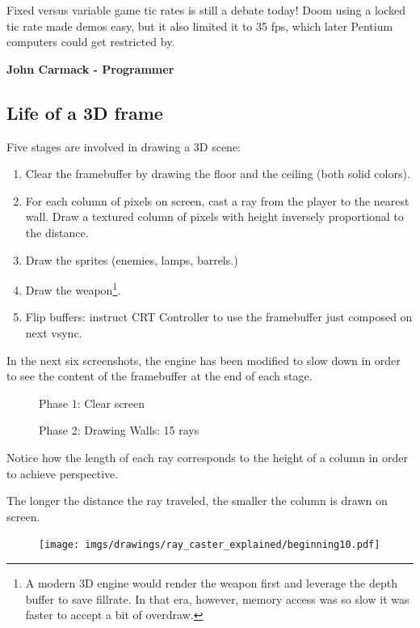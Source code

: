 \begin{fancyquotes}
 Fixed versus variable game tic rates is still a debate today!  Doom using a locked tic rate made demos easy, but it also limited it to 35 fps, which later Pentium computers could get restricted by.\\
\par
\textbf{John Carmack - Programmer}
 \end{fancyquotes}

\subsection{Life of a 3D frame}
Five stages are involved in drawing a 3D scene:\\
\begin{enumerate}
 \item Clear the framebuffer by drawing the floor and the ceiling (both solid colors).
 \item For each column of pixels on screen, cast a ray from the player to the nearest wall. Draw a textured column of pixels with height inversely proportional to the distance.
 \item Draw the sprites (enemies, lamps, barrels.)
 \item Draw the weapon\footnote{A modern 3D engine would render the weapon first and leverage the depth buffer to save fillrate. In that era, however, memory access was so slow it was faster to accept a bit of overdraw.}.	
 \item Flip buffers: instruct CRT Controller to use the framebuffer just composed on next vsync.
\end{enumerate}
In the next six screenshots, the engine has been modified to slow down in order to see the content of the framebuffer at the end of each stage.\\
\begin{figure}[H]
\centering
 \caption{Phase 1: Clear screen}
 \end{figure}




\begin{figure}[H]
 \centering
  \caption{Phase 2: Drawing Walls: 15 rays} 
\end{figure}
\begin{minipage}{.4\textwidth}
Notice how the length of each ray corresponds to the height of a column in order to achieve perspective.\\
\par
The longer the distance the ray traveled, the smaller the column is drawn on screen.
 \end{minipage}
\begin{minipage}{.6\textwidth}
\begin{figure}[H]
  \centering
 \texttt{[image: imgs/drawings/ray\_caster\_explained/beginning10.pdf]}
   
\end{figure}
\end{minipage}




